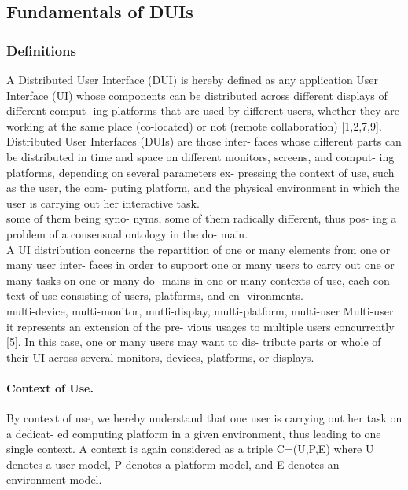 \subsection{Fundamentals of DUIs}
\subsubsection{Definitions}

\cite{melchior2011distributed} A Distributed User Interface (DUI) is hereby
defined as any application User Interface (UI) whose components can be
distributed across different displays of different comput- ing platforms that
are used by different users, whether they are working at the same place (co-located) or not (remote collaboration) [1,2,7,9]. \\


\cite{demeure20084c} Distributed User Interfaces (DUIs) are those inter- faces
whose different parts can be distributed in time and space on different
monitors, screens, and comput- ing platforms, depending on several parameters
ex- pressing the context of use, such as the user, the com- puting platform, and the physical environment in which the user is carrying out her interactive task. \\ 

\cite{vanderdonckt2010distributed} some of them being syno- nyms, some of them radically different, thus pos- ing a problem of a consensual ontology in the do- main.\\

\cite{vanderdonckt2010distributed} A UI distribution concerns the repartition of
one or many elements from one or many user inter- faces in order to support one
or many users to carry out one or many tasks on one or many do- mains in one or
many contexts of use, each con- text of use consisting of users, platforms, and en- vironments.\\

\cite{vanderdonckt2010distributed}  multi-device, multi-monitor, mutli-display,
multi-platform, multi-user Multi-user: it represents an extension of the pre-
vious usages to multiple users concurrently [5]. In this case, one or many users
may want to dis- tribute parts or whole of their UI across several monitors,
devices, platforms, or displays. \\

\paragraph{Context of Use.}
\cite{vanderdonckt2010distributed}By context of use, we hereby understand that
one user is carrying out her task on a dedicat- ed computing platform in a given
environment, thus leading to one single context. A context is again considered
as a triple C=(U,P,E) where U denotes a user model, P denotes a platform model, and E denotes an environment model.\\


